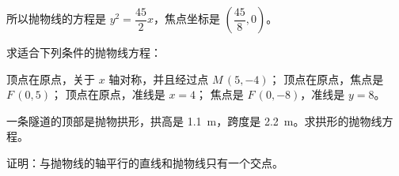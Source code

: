 \medskip
所以抛物线的方程是 $y^2=\dfrac{45}{2}x$，焦点坐标是 $\left(\dfrac{45}{8},0\right)$。

\begin{Practice}
  \begin{question}
    \item 求适合下列条件的抛物线方程：
    \begin{tasks}
      \task 顶点在原点，关于 $x$ 轴对称，并且经过点 $M\,(5,-4)$；
      \task 顶点在原点，焦点是 $F\,(0,5)$；
      \task 顶点在原点，准线是 $x=4$；
      \task 焦点是 $F\,(0,-8)$，准线是 $y=8$。
    \end{tasks}
    \item 一条隧道的顶部是抛物拱形，拱高是 \qty{1.1}{m}，跨度是 \qty{2.2}{m}。求拱形的抛物线方程。
    \item 证明：与抛物线的轴平行的直线和抛物线只有一个交点。
  \end{question}
\end{Practice}


